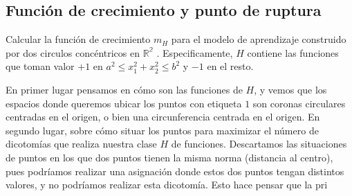 \documentclass[11pt,leqno]{article}
\theoremstyle{definition}
\begin{document}
\subsection{Función de crecimiento y punto de ruptura}
\begin{cuestion}
Calcular la función de crecimiento $m_H$ para el modelo de aprendizaje construido
por dos circulos concéntricos en $\mathbb{R^2}$ . Especificamente, $H$ contiene las funciones que
toman valor $+1$ en $a^2 ≤ x_1^2 + x_2^2 ≤ b^2$ y $−1$ en el resto.
\end{cuestion}

\begin{solucion}
En primer lugar pensamos en cómo son las funciones de $H$, y vemos que los espacios donde queremos ubicar los puntos con etiqueta $1$ son coronas circulares centradas en el origen, o bien una circunferencia centrada en el origen. En segundo lugar, sobre cómo situar los puntos para maximizar el número de dicotomías que realiza nuestra clase $H$ de funciones. Descartamos las situaciones de puntos en los que dos puntos tienen la misma norma (distancia al centro), pues podríamos realizar una asignación donde estos dos puntos tengan distintos valores, y no podríamos realizar esta dicotomía. Esto hace pensar que la pri
\end{solucion}
\end{document}

